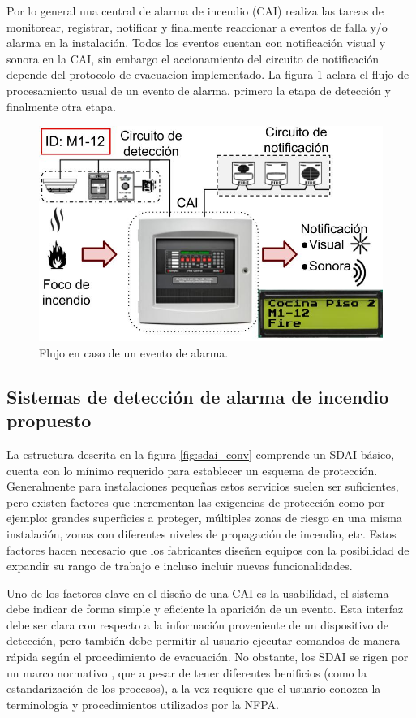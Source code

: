 Por lo general una central de alarma de incendio (CAI) realiza las tareas de monitorear, registrar, notificar y finalmente reaccionar a eventos de falla y/o alarma en la instalación. Todos los eventos cuentan con notificación visual y sonora en la CAI, sin embargo el accionamiento del circuito de notificación depende del protocolo de evacuacion implementado. La figura \ref{fig:flujo_conv} aclara el flujo de procesamiento usual de un evento de alarma, primero la etapa de detección y finalmente otra etapa. 

\begin{figure}[ht]
	\centering
	\includegraphics[scale=.45]{./Figures/flujo_conv.jpg}
	\caption{Flujo en caso de un evento de alarma.}
	\label{fig:flujo_conv}
\end{figure}


\subsection{Sistemas de detección de alarma de incendio propuesto}
%
La estructura descrita en la figura \ref{fig:sdai_conv} comprende un SDAI básico, cuenta con lo mínimo requerido para establecer un esquema de protección. Generalmente para instalaciones pequeñas estos servicios suelen ser suficientes, pero existen factores que incrementan las exigencias de protección como por ejemplo: grandes superficies a proteger, múltiples zonas de riesgo en una misma instalación, zonas con diferentes niveles de propagación de incendio, etc. Estos factores hacen necesario que los fabricantes diseñen equipos con la posibilidad de expandir su rango de trabajo e incluso incluir nuevas funcionalidades.

Uno de los factores clave en el diseño de una CAI es la usabilidad, el sistema debe indicar de forma simple y eficiente la aparición de un evento. Esta interfaz debe ser clara con respecto a la información proveniente de un dispositivo de detección, pero también debe permitir al usuario ejecutar comandos de manera rápida según el procedimiento de evacuación. No obstante, los SDAI se rigen por un marco normativo \citep{nfpa_1}, que a pesar de tener diferentes benificios (como la estandarización de los procesos), a la vez requiere que el usuario conozca la terminología y procedimientos utilizados por la NFPA.  

